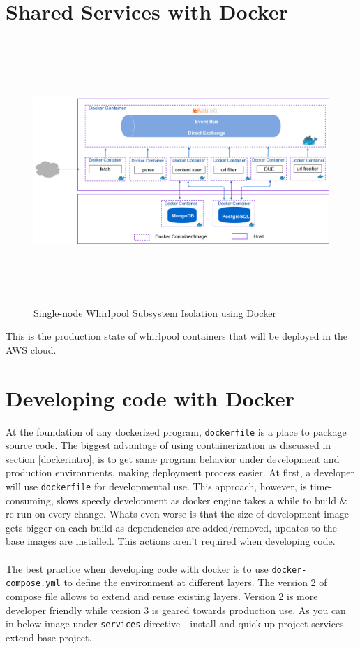 \section{Shared Services with Docker}
\begin{figure}[h!]
  \centering
  \includegraphics[width=18cm,height=10cm,keepaspectratio]{../media/crawler/multi-container-deploy.png}
  \caption{Single-node Whirlpool Subsystem Isolation using Docker}
  \label{fig:multicontainer}
\end{figure}

This is the production state of whirlpool containers that will be deployed in the AWS cloud.  
\pagebreak

\section{Developing code with Docker}\label{devdocker}
At the foundation of any dockerized program, \texttt{dockerfile} is a place to package source code. The biggest advantage of using containerization as discussed in section \ref{dockerintro}, is to get same program behavior under development and production environments, making deployment process easier. At first, a developer will use \texttt{dockerfile} for developmental use. This approach, however, is time-consuming, slows speedy development as docker engine takes a while to build \& re-run on every change. Whats even worse is that the size of development image gets bigger on each build as dependencies are added/removed, updates to the base images are installed. This actions aren't required when developing code. 
\\
\\
The best practice when developing code with docker is to use \texttt{docker-compose.yml} to define the environment at different layers. The version 2 of compose file allows to extend and reuse existing layers. Version 2 is more developer friendly while
version 3 is geared towards production use. As you can in below image under
\texttt{services} directive - install and quick-up project services extend base
project.

